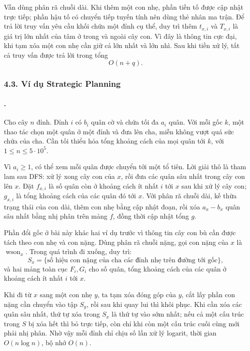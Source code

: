 \documentclass[11pt]{article}
\begin{document}
Vẫn dùng phân rã chuỗi dài. Khi thêm một con nhẹ, phần tiền tố được cập nhật
trực tiếp; phần hậu tố có chuyển tiếp tuyến tính nên dùng thẻ nhân ma trận.
Để trả lời truy vấn yêu cầu khối chứa một đỉnh cụ thể, duy trì thêm
\(t_{x,i}\) và \(T_{x,i}\) là giá trị lớn nhất của tâm ở trong và ngoài cây
con. Vì đây là thông tin cực đại, khi tạm xóa một con nhẹ cần giữ cả lớn nhất
và lớn nhì. Sau khi tiền xử lý, tất cả truy vấn được trả lời trong tổng
\[
  O(n+q).
\]

\subsubsection*{4.3. Ví dụ Strategic Planning}

\paragraph{.}
Cho cây \(n\) đỉnh. Đỉnh \(i\) có \(b_i\) quân cờ và chứa tối đa \(a_i\) quân.
Với mỗi gốc \(k\), một thao tác chọn một quân ở một đỉnh và đưa lên cha, miễn
không vượt quá sức chứa của cha. Cần tối thiểu hóa tổng khoảng cách của mọi
quân tới \(k\), với \(1\le n\le 5\cdot 10^5\).

Vì \(a_i\ge 1\), có thể xem mỗi quân được chuyển tới một tổ tiên. Lời giải thô
là tham lam sau DFS: xử lý xong cây con của \(x\), rồi đưa các quân sâu nhất
trong cây con lên \(x\). Đặt \(f_{x,i}\) là số quân còn ở khoảng cách ít nhất
\(i\) tới \(x\) sau khi xử lý cây con; \(g_{x,i}\) là tổng khoảng cách của các
quân đó tới \(x\). Với phân rã chuỗi dài, kế thừa trạng thái của con dài, thêm
con nhẹ bằng cập nhật đoạn, rồi xóa \(a_x-b_x\) quân sâu nhất bằng nhị phân
trên mảng \(f\), đồng thời cập nhật tổng \(g\).

Phần đổi gốc ở bài này khác hai ví dụ trước vì thông tin cây con bù cần được
tách theo con nhẹ và con nặng. Dùng phân rã chuỗi nặng, gọi con nặng của
\(x\) là \(\operatorname{wson}_x\). Trong quá trình đi xuống, duy trì:
\[
  S_x=\{\text{số hiệu con nặng của cha các đỉnh nhẹ trên đường tới gốc}\},
\]
và hai mảng toàn cục \(F_i,G_i\) cho số quân, tổng khoảng cách của các quân ở
khoảng cách ít nhất \(i\) tới \(x\).

Khi đi từ \(x\) sang một con nhẹ \(y\), ta tạm xóa đóng góp của \(y\), cắt lấy
phần con nặng cần chuyển vào tập \(S_y\), rồi sau khi quay lui thì khôi phục.
Khi cần xóa các quân sâu nhất, thứ tự xóa trong \(S_x\) là thứ tự vào sớm nhất;
nếu cả một cấu trúc trong \(S\) bị xóa hết thì bỏ trực tiếp, còn chỉ khi còn
một cấu trúc cuối cùng mới phải nhị phân. Nhờ vậy mỗi đỉnh chỉ chịu số lần xử
lý logarit, thời gian \(O(n\log n)\), bộ nhớ \(O(n)\).
\end{document}
